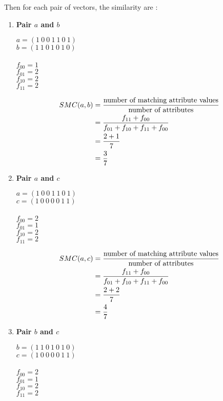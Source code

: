 \documentclass[12pt]{article}%
\begin{document}
\begin{enumerate}
\begin{enumerate}
		\par Then for each pair of vectors, the similarity are :
		\begin{enumerate}
			\item \textbf{Pair $a$ and $b$}
			\par $a = (1 \ 0 \ 0 \ 1 \ 1 \ 0 \ 1)$ \\ $b = (1 \ 1 \ 0 \ 1 \ 0 \ 1 \ 0)$ \\
			\\ $f_{00} = 1$
			\\ $f_{01} = 2$
			\\ $f_{10} = 2$
			\\ $f_{11} = 2$

			\begin{align*}
				SMC(a,b) & = \frac{\textup{number of matching attribute values}}{\textup{number of attributes}} \\ 
				& = \frac{f_{11}+f_{00}}{f_{01}+f_{10}+f_{11}+f_{00}} \\
				& = \frac{2 + 1}{7} \\
				& = \frac{3}{7}
			\end{align*}

			\item \textbf{Pair $a$ and $c$}
			\par $a = (1 \ 0 \ 0 \ 1 \ 1 \ 0 \ 1)$ \\ $c = (1 \ 0 \ 0 \ 0 \ 0 \ 1 \ 1)$ \\
			\\ $f_{00} = 2$
			\\ $f_{01} = 1$
			\\ $f_{10} = 2$
			\\ $f_{11} = 2$

			\begin{align*}
				SMC(a,c) & = \frac{\textup{number of matching attribute values}}{\textup{number of attributes}} \\ 
				& = \frac{f_{11}+f_{00}}{f_{01}+f_{10}+f_{11}+f_{00}} \\
				& = \frac{2 + 2}{7} \\
				& = \frac{4}{7}
			\end{align*}

			\item \textbf{Pair $b$ and $c$}
			\par $b = (1 \ 1 \ 0 \ 1 \ 0 \ 1 \ 0)$ \\ $c = (1 \ 0 \ 0 \ 0 \ 0 \ 1 \ 1)$ \\
			\\ $f_{00} = 2$
			\\ $f_{01} = 1$
			\\ $f_{10} = 2$
			\\ $f_{11} = 2$


\end{enumerate}
\end{enumerate}
\end{enumerate}
\end{document}
